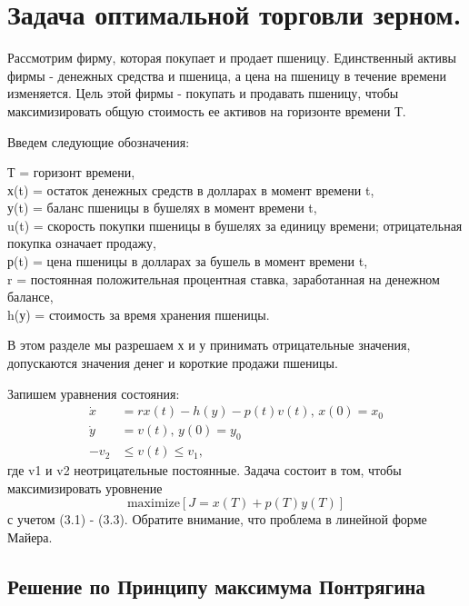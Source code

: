 \section{Задача оптимальной торговли зерном.}

Рассмотрим фирму, которая покупает и продает пшеницу. Единственный активы фирмы - денежных средства и пшеница, а цена на пшеницу в течение времени изменяется. Цель этой фирмы - покупать и продавать пшеницу, чтобы максимизировать общую стоимость ее активов на горизонте времени Т.  

Введем следующие обозначения:
 
{Т} = горизонт времени,\\
{х(t)} = остаток денежных средств в долларах в момент времени t,\\
{у(t)} = баланс пшеницы в бушелях в момент времени t,\\ 
{u(t)} = скорость покупки пшеницы в бушелях за единицу времени; отрицательная покупка означает продажу,\\
{р(t)} = цена пшеницы в долларах за бушель в момент времени t,\\
{r} = постоянная положительная процентная ставка, заработанная на денежном балансе,\\
{h(у)} = стоимость за время хранения пшеницы.
 
В этом разделе мы разрешаем {х} и {у} принимать отрицательные значения, допускаются значения денег и короткие продажи пшеницы.



Запишем уравнения состояния:
\begin{align}
    \Dot{x} & = r x(t) - h(y) - p(t) v(t),\, x(0) = x_{0} \\
    \Dot{y} & = v(t), \, y(0) = y_{0} \\
    - v_2 & \le v(t) \le v_1,
\end{align}    
где {v1} и {v2} неотрицательные постоянные. Задача состоит в том, чтобы максимизировать уровнение
\[
  \mathrm{maximize} [J = x(T) + p(T) y(T)]
\]
с учетом (3.1) - (3.3). Обратите внимание, что проблема в линейной форме Майера.

\subsection{Решение по Принципу максимума Понтрягина}

